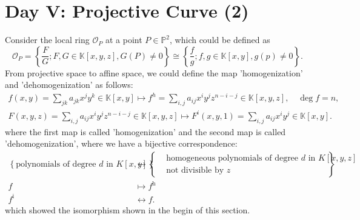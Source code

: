 \documentclass[10pt]{article}
\begin{document}
\section{Day V: Projective Curve (2)}

Consider the local ring $ \mathcal{O}_{P}$ at a point $ P \in \mathbb{P}^{2}$, which could be defined as
\begin{equation*}
  \mathcal{O}_{P} = \left\{ \frac{F}{G} ; F, G \in \mathbb{K}[x,y,z] , G(P) \neq 0 \right\} \cong \left\{ \frac{f}{g}; f, g \in \mathbb{K}[x,y] , g(p) \neq 0 \right\}.
\end{equation*}
From projective space to affine space, we could define the map 'homogenization' and 'dehomogenization' as follows:
\begin{equation*}
  \begin{aligned}
    f(x,y) = \sum_{jk} a_{jk} x^{j} y^{k} \in \mathbb{K}[x,y] \mapsto f^{h} = \sum_{i,j} a_{ij} x^{i} y^{j} z^{n-i-j} \in \mathbb{K}[x,y,z], \quad \deg f = n, \\
    F(x,y,z) = \sum_{i,j} a_{ij} x^{i} y^{j} z^{n-i-j} \in \mathbb{K}[x,y,z] \mapsto F^{i}(x,y,1) = \sum_{i,j} a_{ij} x^{i} y^{j} \in \mathbb{K}[x,y].
  \end{aligned}
\end{equation*}
where the first map is called 'homogenization' and the second map is called 'dehomogenization', where we have a bijective correspondence:
\begin{equation*}
  \begin{aligned}
    \left\{\text{polynomials of degree }d\text{ in }K[x,y]\right\}
    &\longleftrightarrow
    \left\{
      \begin{aligned}
        &\text{homogeneous polynomials of degree }d\text{ in }K[x,y,z]\\
        &\text{not divisible by }z
    \end{aligned}\right\}\\
    f &\longmapsto f^\mathrm{h}\\
    f^\mathrm{i} &\longleftrightarrow f.
  \end{aligned}
\end{equation*}
which showed the isomorphism shown in the begin of this section.
\end{document}
